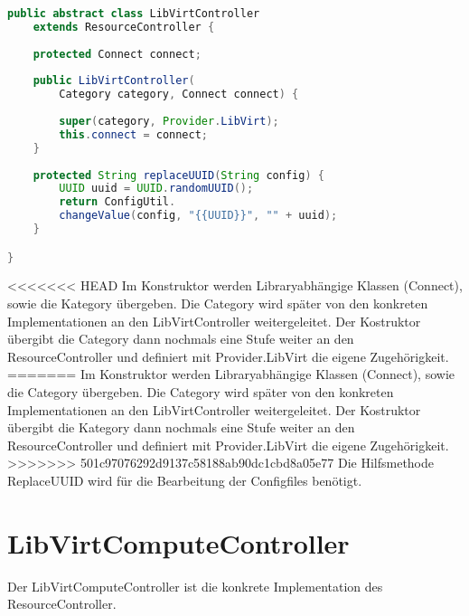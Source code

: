 \begin{lstlisting}[language=Java,frame=single] 
public abstract class LibVirtController 
	extends ResourceController {
	
	protected Connect connect;
	
	public LibVirtController(
		Category category, Connect connect) {
		
		super(category, Provider.LibVirt);
		this.connect = connect;
	}
	
	protected String replaceUUID(String config) {
		UUID uuid = UUID.randomUUID();
		return ConfigUtil.
		changeValue(config, "{{UUID}}", "" + uuid);
	}

}
\end{lstlisting}
<<<<<<< HEAD
Im Konstruktor werden Libraryabhängige Klassen (Connect), sowie die Kategory übergeben. Die Category wird später von den konkreten Implementationen an den LibVirtController weitergeleitet. Der Kostruktor übergibt die Category dann nochmals eine Stufe weiter an den ResourceController und definiert mit Provider.LibVirt die eigene Zugehörigkeit.
=======
Im Konstruktor werden Libraryabhängige Klassen (Connect), sowie die Category übergeben. Die Category wird später von den konkreten Implementationen an den LibVirtController weitergeleitet. Der Kostruktor übergibt die Kategory dann nochmals eine Stufe weiter an den ResourceController und definiert mit Provider.LibVirt die eigene Zugehörigkeit.
>>>>>>> 501c97076292d9137c58188ab90dc1cbd8a05e77
Die Hilfsmethode ReplaceUUID wird für die Bearbeitung der Configfiles benötigt.

\newpage
\section{LibVirtComputeController}
Der LibVirtComputeController ist die konkrete Implementation des ResourceController.

